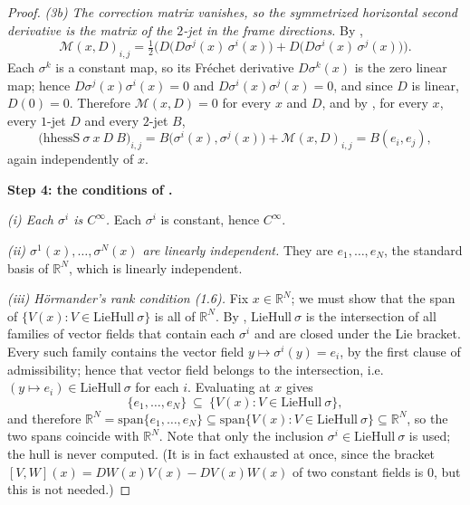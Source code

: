 \begin{proof}
\emph{(3b) The correction matrix vanishes, so the symmetrized horizontal second derivative
is the matrix of the $2$-jet in the frame directions.} By ,
\[
 \mathcal M(x,D)_{i,j}=\tfrac12\Big(D\big(D\sigma^{j}(x)\,\sigma^{i}(x)\big)
   +D\big(D\sigma^{i}(x)\,\sigma^{j}(x)\big)\Big).
\]
Each $\sigma^{k}$ is a constant map, so its Fr\'echet derivative $D\sigma^{k}(x)$ is the
zero linear map; hence $D\sigma^{j}(x)\sigma^{i}(x)=0$ and
$D\sigma^{i}(x)\sigma^{j}(x)=0$, and since $D$ is linear, $D(0)=0$. Therefore
$\mathcal M(x,D)=0$ for every $x$ and $D$, and by , for every $x$, every
$1$-jet $D$ and every $2$-jet $B$,
\[
 \big(\mathrm{hhessS}\ \sigma\ x\ D\ B\big)_{i,j}
  =B\big(\sigma^i(x),\sigma^j(x)\big)+\mathcal M(x,D)_{i,j}=B(e_i,e_j),
\]
again independently of $x$.

\medskip\noindent\textbf{Step 4: the conditions of .}

\emph{(i) Each $\sigma^i$ is $C^\infty$.} Each $\sigma^i$ is constant, hence $C^\infty$.

\emph{(ii) $\sigma^1(x),\ldots,\sigma^N(x)$ are linearly independent.} They are
$e_1,\ldots,e_N$, the standard basis of $\mathbb R^N$, which is linearly independent.

\emph{(iii) H\"ormander's rank condition (1.6).} Fix $x\in\mathbb R^N$; we must show
that the span of $\{V(x):V\in\mathrm{LieHull}\ \sigma\}$ is all of $\mathbb R^N$. By
, $\mathrm{LieHull}\ \sigma$ is the intersection of all families of vector
fields that contain each $\sigma^i$ and are closed under the Lie bracket. Every such family
contains the vector field $y\mapsto\sigma^i(y)=e_i$, by the first clause of admissibility;
hence that vector field belongs to the intersection, i.e.
$(y\mapsto e_i)\in\mathrm{LieHull}\ \sigma$ for each $i$. Evaluating at $x$ gives
\[
 \{e_1,\ldots,e_N\}\ \subseteq\ \{V(x):V\in\mathrm{LieHull}\ \sigma\},
\]
and therefore
$\mathbb R^N=\mathrm{span}\{e_1,\ldots,e_N\}\subseteq
\mathrm{span}\{V(x):V\in\mathrm{LieHull}\ \sigma\}\subseteq\mathbb R^N$,
so the two spans coincide with $\mathbb R^N$. Note that only the inclusion
$\sigma^i\in\mathrm{LieHull}\ \sigma$ is used; the hull is never computed. (It is in fact
exhausted at once, since the bracket $[V,W](x)=DW(x)V(x)-DV(x)W(x)$ of two constant fields
is $0$, but this is not needed.)


\end{proof}
